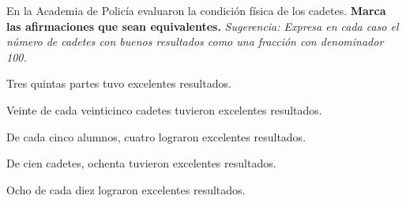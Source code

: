 \question En la Academia de Policía evaluaron la condición física de los cadetes.
\textbf{Marca las afirmaciones que sean equivalentes.}
\emph{Sugerencia: Expresa en cada caso el número de cadetes con buenos resultados como una fracción
    con denominador 100.}
\begin{checkboxes}
    \item Tres quintas partes tuvo excelentes resultados.\\
    \item Veinte de cada veinticinco cadetes tuvieron excelentes resultados.\\
    \item De cada cinco alumnos, cuatro lograron excelentes resultados.\\
    \item De cien cadetes, ochenta tuvieron excelentes resultados.\\
    \item Ocho de cada diez lograron excelentes resultados.\\
\end{checkboxes}
